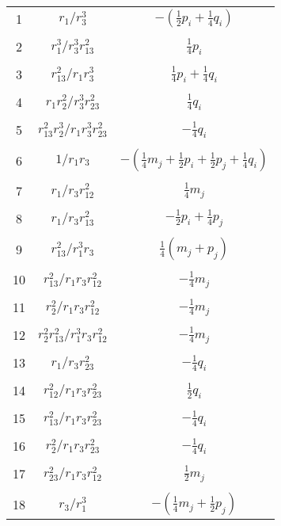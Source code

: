 \documentclass[Dissertation.tex]{subfiles}
\begin{document}
\begin{center}
\begin{longtable}{|c|c|c|}
1  & $r_1/r_3^3$  & $-(\frac{1}{2}p_i + \frac{1}{4}q_i)$ \\
&  &  \\
2  & $r_1^3/r_3^3 r_{13}^2$  & $\frac{1}{4}p_i$ \\
&  &  \\
3  & $r_{13}^2/r_1 r_3^3$  & $\frac{1}{4}p_i + \frac{1}{4}q_i$ \\
&  &  \\
4  & $r_1 r_2^2/r_3^3 r_{23}^2$  & $\frac{1}{4} q_i$ \\
&  &  \\
5  & $r_{13}^2 r_2^3/r_1 r_3^3 r_{23}^2$  & $-\frac{1}{4} q_i$ \\
&  &  \\
6  & $1/r_1 r_3$  & $-(\frac{1}{4}m_j + \frac{1}{2}p_i + \frac{1}{2}p_j + \frac{1}{4}q_i)$ \\
&  &  \\
7  & $r_1/r_3 r_{12}^2$  & $\frac{1}{4}m_j$ \\
&  &  \\
8  & $r_1/r_3 r_{13}^2$  & $-\frac{1}{2}p_i + \frac{1}{4}p_j$ \\
&  &  \\
9  & $r_{13}^2/r_1^3 r_3$  & $\frac{1}{4}(m_j + p_j)$ \\
&  &  \\
10  & $r_{13}^2/r_1 r_3 r_{12}^2$  & $-\frac{1}{4}m_j$ \\
&  &  \\
11  & $r_2^2/r_1 r_3 r_{12}^2$  & $-\frac{1}{4}m_j$ \\
&  &  \\
12  & $r_2^2 r_{13}^2/r_1^3 r_3 r_{12}^2$  & $-\frac{1}{4} m_j$ \\
&  &  \\
13  & $r_1/r_3 r_{23}^2$  & $-\frac{1}{4} q_i$ \\
&  &  \\
14  & $r_{12}^2/r_1 r_3 r_{23}^2$  & $\frac{1}{2} q_i$ \\
&  &  \\
15  & $r_{13}^2/r_1 r_3 r_{23}^2$  & $-\frac{1}{4} q_i$ \\
&  &  \\
16  & $r_2^2/r_1 r_3 r_{23}^2$  & $-\frac{1}{4} q_i$ \\
&  &  \\
17  & $r_{23}^2/r_1 r_3 r_{12}^2$  & $\frac{1}{2} m_j$ \\
&  &  \\
18  & $r_3/r_1^3$  & $-(\frac{1}{4}m_j + \frac{1}{2}p_j)$ \\

\end{longtable}
\end{center}
\end{document}
